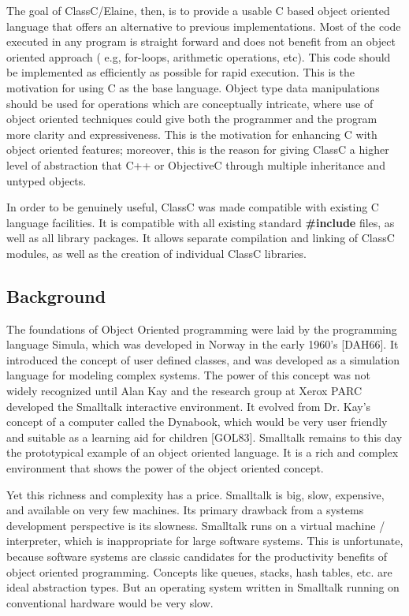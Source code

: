 The goal of ClassC/Elaine, then, is to provide a usable C based object
oriented language that offers an alternative to previous implementations.
Most of the code executed in any program is straight forward and does not
benefit from an object oriented approach ( e.g, for-loops, arithmetic
operations, etc).  This code should be implemented as efficiently as
possible for rapid execution.  This is the motivation for using C as the
base language.  Object type data manipulations should be used for operations
which are conceptually intricate, where use of object oriented techniques
could give both the programmer and the program more clarity and
expressiveness.  This is the motivation for enhancing C with object oriented
features; moreover, this is the reason for giving ClassC a higher level of
abstraction that C++ or ObjectiveC through multiple inheritance
and untyped objects.

In order to be genuinely useful, ClassC was made compatible with existing
C language facilities.  It is compatible with all existing standard
{\bf \#include}
files, as well as all library packages.  It allows separate
compilation and linking of ClassC modules, as well as the creation of
individual ClassC libraries.

\subsection{Background}
The foundations of Object Oriented programming were laid by the
programming language Simula, which was developed in Norway in the early
1960's [DAH66].  It introduced the concept of user defined classes, and was
developed as a simulation language for modeling complex systems.
The power of this concept was not widely recognized until Alan Kay and the
research group at Xerox PARC developed the Smalltalk interactive
environment.  It evolved from Dr. Kay's concept of a computer called the
Dynabook, which would be very user friendly and suitable as a learning
aid for children [GOL83].
Smalltalk remains to this day the prototypical example of
an object oriented language.  It is a rich and complex environment that
shows the power of the object oriented concept.

Yet this richness and complexity has a price.  Smalltalk is big, slow,
expensive, and available on very few machines.  Its primary drawback from a
systems development perspective is its slowness.  Smalltalk runs on a
virtual machine / interpreter, which is inappropriate for large software
systems.  This is unfortunate, because software systems are classic
candidates for the productivity benefits of object oriented programming.
Concepts like queues, stacks, hash tables, etc. are ideal abstraction
types.  But an operating system written in Smalltalk running on conventional
hardware would be very slow.

